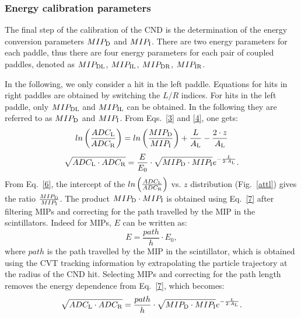 \subsubsection{Energy calibration parameters}\label{sec_energy_cal}

The final step of the calibration of the CND is the determination of the energy conversion parameters $MIP_{\rm{D}}$ and $MIP_{\rm{I}}$. There are two energy parameters for each paddle, thus there are four energy parameters for each pair of coupled paddles, denoted as $MIP_{\rm{DL}}$, $MIP_{\rm{IL}}$, $MIP_{\rm{DR}}$, $MIP_{\rm{IR}}$.

In the following, we only consider a hit in the left paddle. Equations for hits in right paddles are obtained by switching the $L/R$ indices. For hits in the left paddle, only $MIP_{\rm{DL}}$ and $MIP_{\rm{IL}}$ can be obtained. In the following they are referred to as $MIP_{\rm{D}}$ and $MIP_{\rm{I}}$. From Eqs.~\ref{3} and \ref{4}, one gets:
\begin{equation}
\label{6}
ln\left(\frac{ADC_{\rm{L}}}{ADC_{\rm{R}}}\right)=ln\left(\frac{MIP_{\rm{D}}}{MIP_{\rm{I}}}\right)+{\frac{L}{A_{\rm{L}}}}-\frac{2\cdot z}{A_{\rm{L}}}
\end{equation}
\begin{equation}
\label{7}
\sqrt{ADC_{\rm{L}}\cdot ADC_{\rm{R}}}=\frac{E}{E_0}\cdot \sqrt{MIP_{\rm{D}}\cdot MIP_{\rm{I}}} e^{-\frac{L}{2\cdot A_{\rm{L}}}}.
\end{equation}
From Eq.~\ref{6}, the intercept of the $ln\left(\frac{ADC_{\rm{L}}}{ADC_{\rm{R}}}\right)$ vs. $z$ distribution (Fig.~\ref{attl}) gives the ratio $\frac{MIP_{\rm{D}}}{MIP_{\rm{I}}}$. %
The product $MIP_{\rm{D}}\cdot MIP_{\rm{I}}$ is obtained using Eq.~\ref{7} after filtering MIPs and correcting for the path travelled by the MIP in the scintillators. Indeed for MIPs, $E$ can be written as:
\begin{equation}
E=\frac{path}{h}\cdot E_0,
\end{equation}
where $path$ is the path travelled by the MIP in the scintillator, which is obtained using the CVT tracking information by extrapolating the particle trajectory at the radius of the CND hit.
Selecting MIPs and correcting for the path length removes the energy dependence from Eq.~\ref{7}, which becomes:
\begin{equation}
\sqrt{ADC_{\rm{L}}\cdot ADC_{\rm{R}}}=\frac{path}{h}\cdot \sqrt{MIP_{\rm{D}}\cdot MIP_{\rm{I}}} e^{-\frac{L}{2\cdot A_{\rm{L}}}} .
\end{equation}

